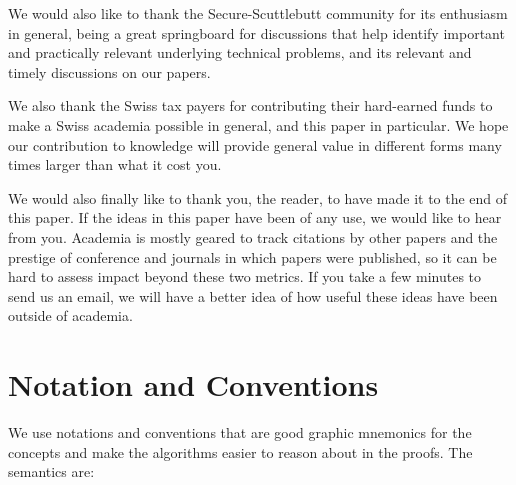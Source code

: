 \documentclass[9pt, oneside]{article}   	%
\begin{document}
We would also like to thank the Secure-Scuttlebutt community for its enthusiasm in general, being a great springboard for discussions that help identify important and practically relevant underlying technical problems, and its relevant and timely discussions on our papers.

We also thank the Swiss tax payers for contributing their hard-earned funds to make a Swiss academia possible in general, and this paper in particular. We hope our contribution to knowledge will provide general value in different forms many times larger than what it cost you.

We would also finally like to thank you, the reader, to have made it to the end of this paper. If the ideas in this paper have been of any use, we would like to hear from you. Academia is mostly geared to track citations by other papers and the prestige of conference and journals in which papers were published, so it can be hard to assess impact beyond these two metrics. If you take a few minutes to send us an email, we will have a better idea of how useful these ideas have been outside of academia.

\newpage




\appendix

\newpage
\section{Notation and Conventions}
\label{apdx:notation}

We use notations and conventions that are good graphic mnemonics for the concepts and make the algorithms easier to reason about in the proofs. The semantics are:
\end{document}
